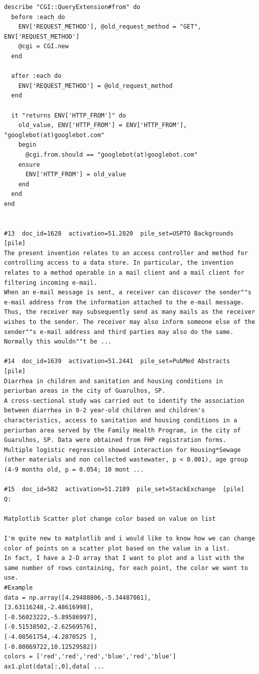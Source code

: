 \begin{verbatim}
describe "CGI::QueryExtension#from" do
  before :each do
    ENV['REQUEST_METHOD'], @old_request_method = "GET", ENV['REQUEST_METHOD']
    @cgi = CGI.new
  end

  after :each do
    ENV['REQUEST_METHOD'] = @old_request_method
  end

  it "returns ENV['HTTP_FROM']" do
    old_value, ENV['HTTP_FROM'] = ENV['HTTP_FROM'], "googlebot(at)googlebot.com"
    begin
      @cgi.from.should == "googlebot(at)googlebot.com"
    ensure
      ENV['HTTP_FROM'] = old_value
    end
  end
end


#13  doc_id=1628  activation=51.2820  pile_set=USPTO Backgrounds  [pile]
The present invention relates to an access controller and method for controlling access to a data store. In particular, the invention relates to a method operable in a mail client and a mail client for filtering incoming e-mail.
When an e-mail message is sent, a receiver can discover the sender""s e-mail address from the information attached to the e-mail message. Thus, the receiver may subsequently send as many mails as the receiver wishes to the sender. The receiver may also inform someone else of the sender""s e-mail address and third parties may also do the same. Normally this wouldn""t be ...

#14  doc_id=1639  activation=51.2441  pile_set=PubMed Abstracts  [pile]
Diarrhea in children and sanitation and housing conditions in periurban areas in the city of Guarulhos, SP.
A cross-sectional study was carried out to identify the association between diarrhea in 0-2 year-old children and children's characteristics, access to sanitation and housing conditions in a periurban area served by the Family Health Program, in the city of Guarulhos, SP. Data were obtained from FHP registration forms. Multiple logistic regression showed interaction for Housing*Sewage (other materials and non collected wastewater, p < 0.001), age group (4-9 months old, p = 0.054; 10 mont ...

#15  doc_id=582  activation=51.2189  pile_set=StackExchange  [pile]
Q:

Matplotlib Scatter plot change color based on value on list

I'm quite new to matplotlib and i would like to know how we can change color of points on a scatter plot based on the value in a list.
In fact, I have a 2-D array that I want to plot and a list with the same number of rows containing, for each point, the color we want to use.
#Example
data = np.array([4.29488806,-5.34487081],
[3.63116248,-2.48616998],
[-0.56023222,-5.89586997],
[-0.51538502,-2.62569576],
[-4.08561754,-4.2870525 ],
[-0.80869722,10.12529582])
colors = ['red','red','red','blue','red','blue']
ax1.plot(data[:,0],data[ ...


\end{verbatim}
